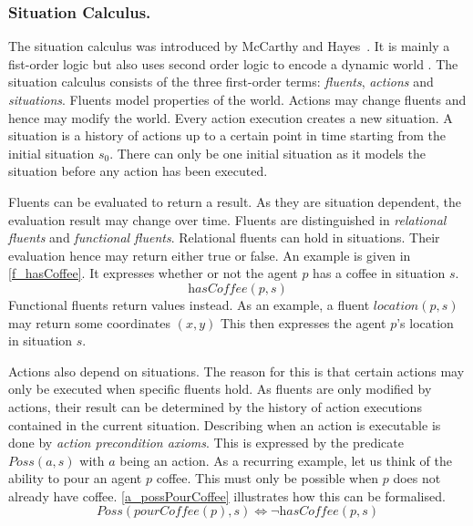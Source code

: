 \subsubsection{Situation Calculus.}\label{fun:apl_sitCalc}
The situation calculus was introduced by McCarthy and Hayes~\cite{mccarthy_philosophical_1969}. It is mainly a fist-order logic but also uses second order logic to encode a dynamic world \cite{levesque_golog:_1997}. The situation calculus consists of the three first-order terms: \emph{fluents}, \emph{actions} and \emph{situations}. Fluents model properties of the world. Actions may change fluents and hence may modify the world. Every action execution creates a new situation. A situation is a history of actions up to a certain point in time starting from the initial situation $s_0$. There can only be one initial situation as it models the situation before any action has been executed.

Fluents can be evaluated to return a result. As they are situation dependent, the evaluation result may change over time. Fluents are distinguished in \emph{relational fluents} and \emph{functional fluents}. Relational fluents can hold in situations. Their evaluation hence may return either true or false. An example is given in \autoref{f_hasCoffee}. It expresses whether or not the agent $p$ has a coffee in situation $s$.
\begin{equation}\label{f_hasCoffee}
  \textit{hasCoffee}(p,s)
\end{equation}
Functional fluents return values instead. As an example, a fluent $\textit{location}(p,s)$ may return some coordinates $(x,y)$ This then expresses the agent $p$'s location in situation $s$.

Actions also depend on situations. The reason for this is that certain actions may only be executed when specific fluents hold. As fluents are only modified by actions, their result can be determined by the history of action executions contained in the current situation. Describing when an action is executable is done by \emph{action precondition axioms}. This is expressed by the predicate $\textit{Poss}(a,s)$ with $a$ being an action. As a recurring example, let us think of the ability to pour an agent $p$ coffee. This must only be possible when $p$ does not already have coffee. \autoref{a_possPourCoffee} illustrates how this can be formalised.
\begin{equation}\label{a_possPourCoffee}
  \textit{Poss}(\textit{pourCoffee}(p),s) \Leftrightarrow \neg \textit{hasCoffee}(p,s)
\end{equation}

